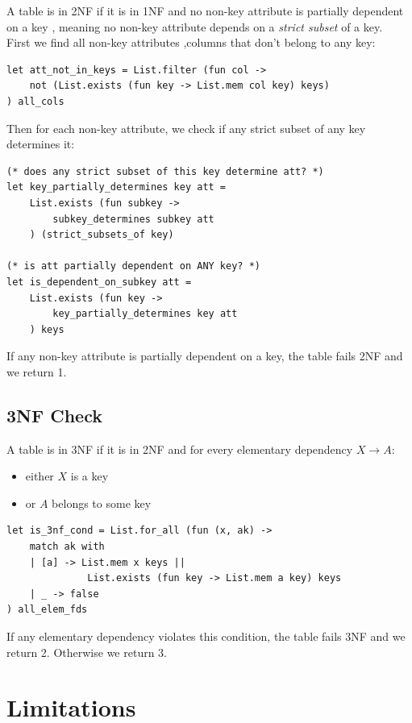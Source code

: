 \documentclass[11pt]{article}
\begin{document}
A table is in 2NF if it is in 1NF and no non-key attribute is partially dependent on a key , meaning no non-key attribute depends on a \textit{strict subset} of a key. \\

First we find all non-key attributes ,columns that don't belong to any key:

\begin{lstlisting}
let att_not_in_keys = List.filter (fun col -> 
    not (List.exists (fun key -> List.mem col key) keys)
) all_cols
\end{lstlisting}

Then for each non-key attribute, we check if any strict subset of any key determines it:

\begin{lstlisting}
(* does any strict subset of this key determine att? *)
let key_partially_determines key att = 
    List.exists (fun subkey -> 
        subkey_determines subkey att
    ) (strict_subsets_of key) 

(* is att partially dependent on ANY key? *)
let is_dependent_on_subkey att = 
    List.exists (fun key -> 
        key_partially_determines key att
    ) keys 
\end{lstlisting}

If any non-key attribute is partially dependent on a key, the table fails 2NF and we return 1.

\subsection{3NF Check}

A table is in 3NF if it is in 2NF and for every elementary dependency $X \rightarrow A$:
\begin{itemize}
    \item either $X$ is a key
    \item or $A$ belongs to some key
\end{itemize}

\begin{lstlisting}
let is_3nf_cond = List.for_all (fun (x, ak) ->
    match ak with
    | [a] -> List.mem x keys || 
              List.exists (fun key -> List.mem a key) keys
    | _ -> false
) all_elem_fds
\end{lstlisting}

If any elementary dependency violates this condition, the table fails 3NF and we return 2. Otherwise we return 3.

\section{Limitations}
\end{document}
